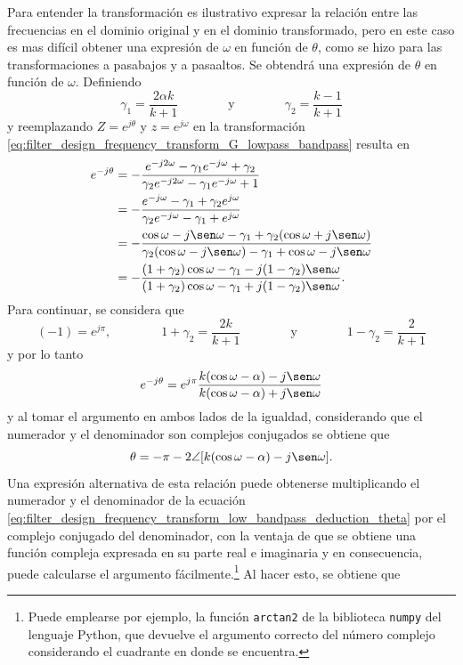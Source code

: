 \documentclass[a4paper]{report}
\begin{document}
Para entender la transformación es ilustrativo expresar la relación entre las frecuencias en el dominio original y en el dominio transformado, pero en este caso es mas difícil obtener una expresión de \(\omega\) en función de \(\theta\), como se hizo para las transformaciones a pasabajos y a pasaaltos. Se obtendrá una expresión de \(\theta\) en función de \(\omega\). Definiendo
\[
 \gamma_1=\frac{2\alpha k}{k+1}
 \qquad\qquad\textrm{y}\qquad\qquad
 \gamma_2=\frac{k-1}{k+1}
\]
y reemplazando \(Z=e^{j\theta}\) y \(z=e^{j\omega}\) en la transformación \ref{eq:filter_design_frequency_transform_G_lowpass_bandpass} resulta en
\begin{align*}
 e^{-j\theta}&=-\frac{e^{-j2\omega}-\gamma_1e^{-j\omega}+\gamma_2}{\gamma_2e^{-j2\omega}-\gamma_1e^{-j\omega}+1}\\
  &=-\frac{e^{-j\omega}-\gamma_1+\gamma_2e^{j\omega}}{\gamma_2e^{-j\omega}-\gamma_1+e^{j\omega}}\\
  &=-\frac{\cos\omega-j\sen\omega-\gamma_1+\gamma_2(\cos\omega+j\sen\omega)}{\gamma_2(\cos\omega-j\sen\omega)-\gamma_1+\cos\omega-j\sen\omega}\\
  &=-\frac{(1+\gamma_2)\cos\omega-\gamma_1-j(1-\gamma_2)\sen\omega}{(1+\gamma_2)\cos\omega-\gamma_1+j(1-\gamma_2)\sen\omega}.
\end{align*}
Para continuar, se considera que 
\[
 (-1)=e^{j\pi},
 \qquad\qquad 
 1+\gamma_2=\frac{2k}{k+1}
 \qquad\qquad\textrm{y}\qquad\qquad
 1-\gamma_2=\frac{2}{k+1}
\]
y por lo tanto
\begin{equation}\label{eq:filter_design_frequency_transform_low_bandpass_deduction_theta}
 e^{-j\theta}=e^{j\pi}\frac{k(\cos\omega-\alpha)-j\sen\omega}{k(\cos\omega-\alpha)+j\sen\omega} 
\end{equation}
y al tomar el argumento en ambos lados de la igualdad, considerando que el numerador y el denominador son complejos conjugados se obtiene que 
\begin{equation}\label{eq:filter_design_frequency_mapping_lowpass_bandpass}
 \theta=-\pi-2\angle[k(\cos\omega-\alpha)-j\sen\omega]. 
\end{equation}
Una expresión alternativa de esta relación puede obtenerse multiplicando el numerador y el denominador de la ecuación \ref{eq:filter_design_frequency_transform_low_bandpass_deduction_theta} por el complejo conjugado del denominador, con la ventaja de que se obtiene una función compleja expresada en su parte real e imaginaria y en consecuencia, puede calcularse el argumento fácilmente.\footnote{Puede emplearse por ejemplo, la función \texttt{arctan2} de la biblioteca \texttt{numpy} del lenguaje Python, que devuelve el argumento correcto del número complejo considerando el cuadrante en  donde se encuentra.} Al hacer esto, se obtiene que 
\end{document}

